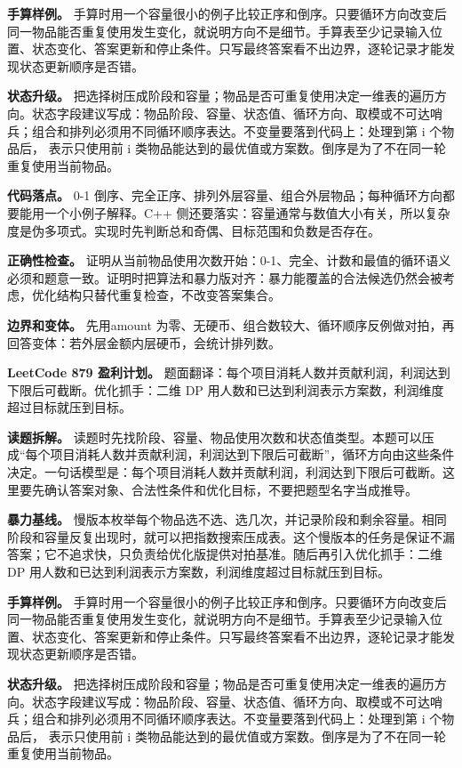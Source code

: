 \textbf{手算样例。} 手算时用一个容量很小的例子比较正序和倒序。只要循环方向改变后同一物品能否重复使用发生变化，就说明方向不是细节。手算表至少记录输入位置、状态变化、答案更新和停止条件。只写最终答案看不出边界，逐轮记录才能发现状态更新顺序是否错。

\textbf{状态升级。} 把选择树压成阶段和容量；物品是否可重复使用决定一维表的遍历方向。状态字段建议写成：物品阶段、容量、状态值、循环方向、取模或不可达哨兵；组合和排列必须用不同循环顺序表达。不变量要落到代码上：处理到第 i 个物品后， 表示只使用前 i 类物品能达到的最优值或方案数。倒序是为了不在同一轮重复使用当前物品。

\textbf{代码落点。} 0-1 倒序、完全正序、排列外层容量、组合外层物品；每种循环方向都要能用一个小例子解释。C++ 侧还要落实：容量通常与数值大小有关，所以复杂度是伪多项式。实现时先判断总和奇偶、目标范围和负数是否存在。

\textbf{正确性检查。} 证明从当前物品使用次数开始：0-1、完全、计数和最值的循环语义必须和题意一致。证明时把算法和暴力版对齐：暴力能覆盖的合法候选仍然会被考虑，优化结构只替代重复检查，不改变答案集合。

\textbf{边界和变体。} 先用amount 为零、无硬币、组合数较大、循环顺序反例做对拍，再回答变体：若外层金额内层硬币，会统计排列数。

\noindent\textbf{LeetCode 879 盈利计划。} 题面翻译：每个项目消耗人数并贡献利润，利润达到下限后可截断。优化抓手：二维 DP 用人数和已达到利润表示方案数，利润维度超过目标就压到目标。

\textbf{读题拆解。} 读题时先找阶段、容量、物品使用次数和状态值类型。本题可以压成“每个项目消耗人数并贡献利润，利润达到下限后可截断”，循环方向由这些条件决定。一句话模型是：每个项目消耗人数并贡献利润，利润达到下限后可截断。这里要先确认答案对象、合法性条件和优化目标，不要把题型名字当成推导。

\textbf{暴力基线。} 慢版本枚举每个物品选不选、选几次，并记录阶段和剩余容量。相同阶段和容量反复出现时，就可以把指数搜索压成表。这个慢版本的任务是保证不漏答案；它不追求快，只负责给优化版提供对拍基准。随后再引入优化抓手：二维 DP 用人数和已达到利润表示方案数，利润维度超过目标就压到目标。

\textbf{手算样例。} 手算时用一个容量很小的例子比较正序和倒序。只要循环方向改变后同一物品能否重复使用发生变化，就说明方向不是细节。手算表至少记录输入位置、状态变化、答案更新和停止条件。只写最终答案看不出边界，逐轮记录才能发现状态更新顺序是否错。

\textbf{状态升级。} 把选择树压成阶段和容量；物品是否可重复使用决定一维表的遍历方向。状态字段建议写成：物品阶段、容量、状态值、循环方向、取模或不可达哨兵；组合和排列必须用不同循环顺序表达。不变量要落到代码上：处理到第 i 个物品后， 表示只使用前 i 类物品能达到的最优值或方案数。倒序是为了不在同一轮重复使用当前物品。

